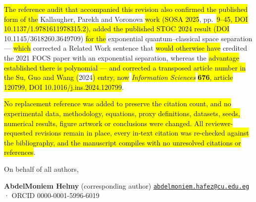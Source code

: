 \documentclass[
  11pt,
]{article}
\providecommand{\DIFadd}[1]{\hl{#1}} %
\providecommand{\DIFdel}[1]{} %
\providecommand{\DIFaddbegin}{} %
\providecommand{\DIFaddend}{} %
\providecommand{\DIFdelbegin}{} %
\providecommand{\DIFdelend}{} %
\providecommand{\DIFaddbegin}{}
\begin{document}
\DIFadd{The reference audit that accompanied this revision also confirmed the
published form of the }\DIFaddend Kallaugher, Parekh and Voronova \DIFdelbegin \DIFdel{(STOC 2024}\DIFdelend \DIFaddbegin \DIFadd{work (SOSA 2025}\DIFaddend ,
pp.~\DIFdelbegin \DIFdel{1805--1815, DOI }\DIFdelend \DIFaddbegin \DIFadd{9--45, DOI 10.1137/1.9781611978315.2), added the published STOC 2024
result (DOI }\DIFaddend 10.1145/3618260.3649709) \DIFdelbegin \DIFdel{, which establishes an
}\DIFdelend \DIFaddbegin \DIFadd{for the }\DIFaddend exponential
quantum--classical space separation \DIFdelbegin \DIFdel{for a natural streaming
problem }\DIFdelend --- \DIFdelbegin \DIFdel{co-cited with it in the Related Work and in the footnote. In
doing so, we }\DIFdelend \DIFaddbegin \DIFadd{which }\DIFaddend corrected a Related Work
sentence that \DIFdelbegin \DIFdel{had }\DIFdelend \DIFaddbegin \DIFadd{would otherwise have }\DIFaddend credited the 2021 FOCS paper with an
exponential separation\DIFdelbegin \DIFdel{; the FOCS 2021 result
provides a polynomial quantum advantage}\DIFdelend , whereas the \DIFdelbegin \DIFdel{STOC }\DIFdelend \DIFaddbegin \DIFadd{advantage established there is
polynomial --- and corrected a transposed article number in the Su, Guo
and Wang (}\DIFaddend 2024\DIFdelbegin \DIFdel{work
establishes the exponential separation. The revised bibliography now
contains 55 entries, including this newly added published anchor, and we
re-checked that every in-text citation matches exactly one bibliography
entry}\DIFdelend \DIFaddbegin \DIFadd{) entry, now }\emph{\DIFadd{Information Sciences}} \textbf{\DIFadd{676}}\DIFadd{,
article 120799, DOI 10.1016/j.ins.2024.120799}\DIFaddend .

\DIFdelbegin \DIFdel{Should the work appear in a peer-reviewed venue before this manuscript
reaches proofs, we will substitute the published version at that stage.
If the Editor considers the presence of even this single, explicitly
labelled preprint unacceptable, we would be grateful for the Editor's
preferred remedy and will follow it}\DIFdelend \DIFaddbegin \DIFadd{No replacement reference was added to preserve the citation count, and
no experimental data, methodology, equations, proxy definitions,
datasets, seeds, numerical results, figure artwork or conclusions were
changed. All reviewer-requested revisions remain in place, every in-text
citation was re-checked against the bibliography, and the manuscript
compiles with no unresolved citations or references}\DIFaddend .

On behalf of all authors,

\textbf{AbdelMoniem Helmy} (corresponding author)
\href{mailto:abdelmoniem.hafez@cu.edu.eg}{\nolinkurl{abdelmoniem.hafez@cu.edu.eg}}
· ORCID 0000-0001-5996-6019
\end{document}

